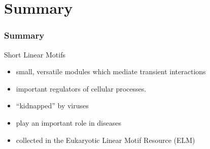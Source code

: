 \documentclass{beamer}
\begin{document}
\section{Summary} 
\begin{frame}\frametitle{Summary} 
    \begin{block}{Short Linear Motifs}
        \begin{itemize}
        \item small, versatile modules which mediate transient interactions
        \item important regulators of cellular processes.
        \item ``kidnapped'' by viruses
        \item play an important role in diseases
        \item collected in the Eukaryotic Linear Motif Resource (ELM)
        \end{itemize}
    \end{block} 
\end{frame}

\appendix
\end{document}
